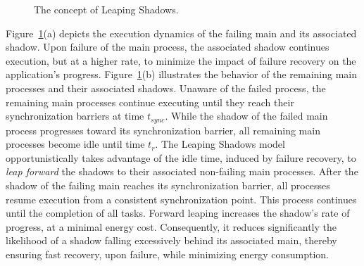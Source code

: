 \begin{figure}[!t]
	\begin{center}
	\end{center}
	\caption{The concept of Leaping Shadows.}
	\label{fig:leap}
\end{figure}

Figure~\ref{fig:leap}(a) depicts the execution dynamics of the failing main and its associated shadow. Upon failure of the main process, the associated shadow continues execution, but at a higher rate, to minimize the impact of failure recovery on the application's progress. 
Figure~\ref{fig:leap}(b) illustrates the behavior of the remaining main processes and their associated shadows. Unaware of the failed process, the remaining main processes continue executing until they reach their synchronization barriers at time $t_{sync}$. While the shadow of the failed main process progresses toward its synchronization barrier, all remaining main processes become idle until time $t_r$. %
The Leaping Shadows model opportunistically takes advantage of the idle time, induced by failure recovery, to {\it leap forward} the shadows to their associated non-failing main processes. 
After the shadow of the failing main reaches its synchronization barrier, all processes resume execution from a consistent synchronization point. This process continues until the completion of all tasks. Forward leaping increases the shadow's rate of progress, at a minimal energy cost. Consequently, it reduces significantly the likelihood of a shadow falling excessively behind its associated main, thereby ensuring fast recovery, upon failure, while minimizing energy consumption.

